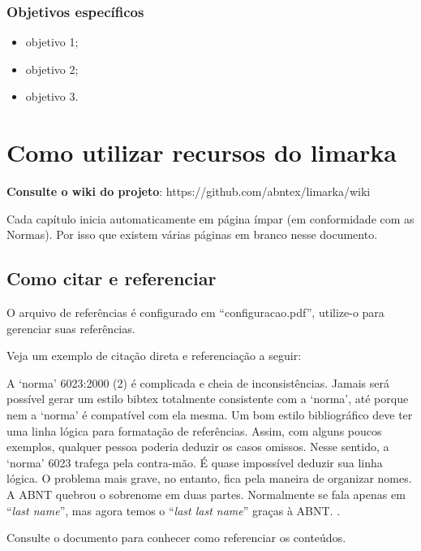 \documentclass[
	12pt,				%
	twoside,			%
	a4paper,			%
	english,			%
	french,				%
	spanish,			%
	brazil				%
	]{abntex2}
\renewenvironment{quote}
  {\small\list{}{\rightmargin=0.1cm \leftmargin=4cm}%
   \item\relax}
  {\endlist}
\begin{document}
\subsection{Objetivos específicos}\label{objetivos-especuxedficos}

\begin{itemize}
\tightlist
\item
  objetivo 1;
\item
  objetivo 2;
\item
  objetivo 3.
\end{itemize}

\chapter{Como utilizar recursos do
limarka}\label{como-utilizar-recursos-do-limarka}

\textbf{Consulte o wiki do projeto}:
https://github.com/abntex/limarka/wiki

Cada capítulo inicia automaticamente em página ímpar (em conformidade
com as Normas). Por isso que existem várias páginas em branco nesse
documento.

\section{Como citar e referenciar}\label{como-citar-e-referenciar}

O arquivo de referências é configurado em ``configuracao.pdf'',
utilize-o para gerenciar suas referências.

Veja um exemplo de citação direta e referenciação a seguir:

\begin{quote}
A `norma' 6023:2000 (2) é complicada e cheia de inconsistências. Jamais
será possível gerar um estilo bibtex totalmente consistente com a
`norma', até porque nem a `norma' é compatível com ela mesma. Um bom
estilo bibliográfico deve ter uma linha lógica para formatação de
referências. Assim, com alguns poucos exemplos, qualquer pessoa poderia
deduzir os casos omissos. Nesse sentido, a `norma' 6023 trafega pela
contra-mão. É quase impossível deduzir sua linha lógica. O problema mais
grave, no entanto, fica pela maneira de organizar nomes. A ABNT quebrou
o sobrenome em duas partes. Normalmente se fala apenas em ``\emph{last
name}'', mas agora temos o ``\emph{last last name}'' graças à ABNT.
\cite[p. 5]{abntex2cite}.
\end{quote}

Consulte o documento  para conhecer como
referenciar os conteúdos.
\end{document}
